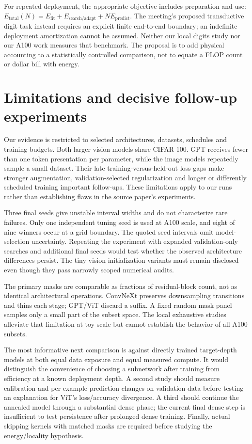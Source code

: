 \documentclass[10pt,letterpaper]{article}
\begin{document}
For repeated deployment, the appropriate objective includes preparation and use: $E_{\mathrm{total}}(N)=E_{\mathrm{fit}}+E_{\mathrm{search/adapt}}+N E_{\mathrm{predict}}$. The meeting's proposed transductive digit task instead requires an explicit finite end-to-end boundary; an indefinite deployment amortization cannot be assumed. Neither our local digits study nor our A100 work measures that benchmark. The proposal is to add physical accounting to a statistically controlled comparison, not to equate a FLOP count or dollar bill with energy.

\clearpage
\section{Limitations and decisive follow-up experiments}
Our evidence is restricted to selected architectures, datasets, schedules and training budgets. Both larger vision models share CIFAR-100. GPT receives fewer than one token presentation per parameter, while the image models repeatedly sample a small dataset. Their late training-versus-held-out loss gaps make stronger augmentation, validation-selected regularization and longer or differently scheduled training important follow-ups. These limitations apply to our runs rather than establishing flaws in the source paper's experiments.

Three final seeds give unstable interval widths and do not characterize rare failures. Only one independent tuning seed is used at A100 scale, and eight of nine winners occur at a grid boundary. The quoted seed intervals omit model-selection uncertainty. Repeating the experiment with expanded validation-only searches and additional final seeds would test whether the observed architecture differences persist. The tiny vision initialization variants must remain disclosed even though they pass narrowly scoped numerical audits.

The primary masks are comparable as fractions of residual-block count, not as identical architectural operations. ConvNeXt preserves downsampling transitions and thins each stage; GPT/ViT discard a suffix. A fixed random mask panel samples only a small part of the subset space. The local exhaustive studies alleviate that limitation at toy scale but cannot establish the behavior of all A100 subsets.

The most informative next comparison is against directly trained target-depth models at both equal data exposure and equal measured compute. It would distinguish the convenience of choosing a subnetwork after training from efficiency at a known deployment depth. A second study should measure calibration and per-example prediction changes on validation data before testing an explanation for ViT's loss/accuracy divergence. A third should continue the annealed model through a substantial dense phase; the current final dense step is insufficient to test persistence after prolonged dense training. Finally, actual skipping kernels with matched masks are required before studying the energy/locality hypothesis.
\end{document}
